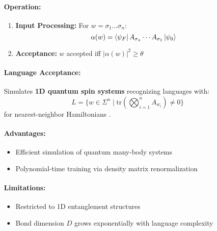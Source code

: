 \paragraph{Operation:}
\begin{enumerate}
    \item \textbf{Input Processing:} For $w = \sigma_1...\sigma_n$:
    \[
    \alpha(w) = \bra{\psi_F} A_{\sigma_n} \cdots A_{\sigma_1} \ket{\psi_0}
    \]
    \item \textbf{Acceptance:} $w$ accepted iff $|\alpha(w)|^2 \geq \theta$
\end{enumerate}

\paragraph{Language Acceptance:}
Simulates \textbf{1D quantum spin systems} recognizing languages with:
\[
L = \{w \in \Sigma^n \mid \text{tr}\left(\bigotimes_{i=1}^n A_{w_i}\right) \neq 0\}
\]
for nearest-neighbor Hamiltonians \cite{vidal2003efficient}.

\paragraph{Advantages:}
\begin{itemize}
    \item Efficient simulation of quantum many-body systems
    \item Polynomial-time training via density matrix renormalization
\end{itemize}

\paragraph{Limitations:}
\begin{itemize}
    \item Restricted to 1D entanglement structures
    \item Bond dimension $D$ grows exponentially with language complexity
\end{itemize}

